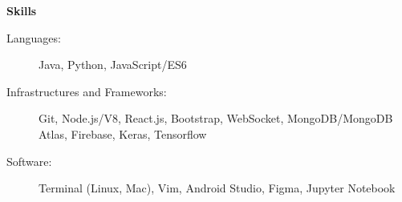 \documentclass[letterpaper,10pt]{article}
\newcommand{\resitem}[1]{\item #1 \vspace{-2pt}}
\newcommand{\resheading}[1]{{\large \colorbox{mygrey}{\begin{minipage}{\textwidth}{\textbf{#1 \vphantom{p\^{E}}}}\end{minipage}}}}
\begin{document}
\begin{itemize}
	
\end{itemize}

\resheading{Skills}

\begin{description}
\item[Languages:] Java, Python, JavaScript/ES6
\item[Infrastructures and Frameworks:] Git, Node.js/V8, React.js, Bootstrap, WebSocket, MongoDB/MongoDB Atlas, Firebase, Keras, Tensorflow
\item[Software:] Terminal (Linux, Mac), Vim, Android Studio, Figma, Jupyter Notebook
\end{description}
\end{document}
